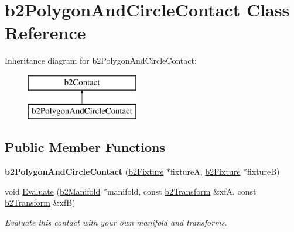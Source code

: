 \hypertarget{classb2_polygon_and_circle_contact}{\section{b2\-Polygon\-And\-Circle\-Contact Class Reference}
\label{classb2_polygon_and_circle_contact}
}
Inheritance diagram for b2\-Polygon\-And\-Circle\-Contact\-:\begin{figure}[H]
\begin{center}
\leavevmode
\includegraphics[height=2.000000cm]{classb2_polygon_and_circle_contact}
\end{center}
\end{figure}
\subsection*{Public Member Functions}
\begin{DoxyCompactItemize}
\item 
\hypertarget{classb2_polygon_and_circle_contact_a38158da229eee22253c1f64df1982e40}{{\bfseries b2\-Polygon\-And\-Circle\-Contact} (\hyperlink{classb2_fixture}{b2\-Fixture} $\ast$fixture\-A, \hyperlink{classb2_fixture}{b2\-Fixture} $\ast$fixture\-B)}\label{classb2_polygon_and_circle_contact_a38158da229eee22253c1f64df1982e40}

\item 
\hypertarget{classb2_polygon_and_circle_contact_ac24d495022aae853cb573f86c8d86c3d}{void \hyperlink{classb2_polygon_and_circle_contact_ac24d495022aae853cb573f86c8d86c3d}{Evaluate} (\hyperlink{structb2_manifold}{b2\-Manifold} $\ast$manifold, const \hyperlink{structb2_transform}{b2\-Transform} \&xf\-A, const \hyperlink{structb2_transform}{b2\-Transform} \&xf\-B)}\label{classb2_polygon_and_circle_contact_ac24d495022aae853cb573f86c8d86c3d}

\begin{DoxyCompactList}\small\item\em Evaluate this contact with your own manifold and transforms. \end{DoxyCompactList}\end{DoxyCompactItemize}
